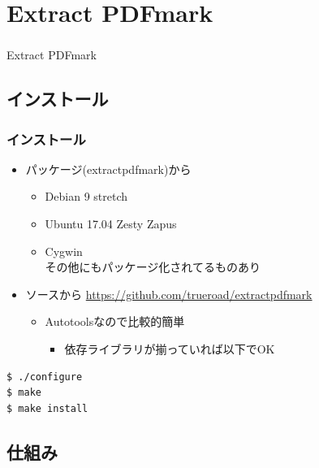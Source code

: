 \documentclass[unicode,17pt]{beamer}
\begin{document}
\section{Extract PDFmark}
\begin{frame}\frametitle{}
  \centering
  Extract PDFmark
\end{frame}

\subsection{インストール}
\begin{frame}[fragile]\frametitle{インストール}
  \begin{itemize}
  \item パッケージ(extractpdfmark)から
    \begin{itemize}
    \item Debian 9 stretch
    \item Ubuntu 17.04 Zesty Zapus
    \item Cygwin\\
      その他にもパッケージ化されてるものあり
    \end{itemize}
  \item ソースから {\tiny
    \url{https://github.com/trueroad/extractpdfmark}}
    \begin{itemize}
    \item Autotoolsなので比較的簡単
      \begin{itemize}
      \item 依存ライブラリが揃っていれば以下でOK
      \end{itemize}
    \end{itemize}
  \end{itemize}
  \centering
  \begin{tcolorbox}[width=0.5\linewidth,left=0mm,right=0mm,top=0mm,bottom=0mm]
    \begin{lstlisting}
$ ./configure
$ make
$ make install
    \end{lstlisting}
  \end{tcolorbox}
\end{frame}

\subsection{仕組み}
\end{document}

